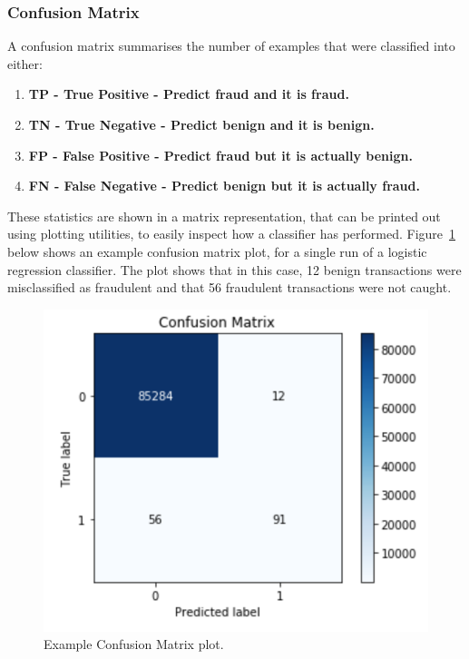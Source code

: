 \documentclass[12pt,a4paper,twoside]{report}
\begin{document}
\subsubsection{Confusion Matrix}

A confusion matrix\cite{stehman1997selecting} summarises the number of examples that were classified into either:\\
\begin{enumerate}
\item \textbf{TP - True Positive - Predict fraud and it is fraud.}
\item \textbf{TN - True Negative - Predict benign and it is benign.}
\item \textbf{FP - False Positive - Predict fraud but it is actually benign.}
\item \textbf{FN - False Negative - Predict benign but it is actually fraud.}

\end{enumerate}

These statistics are shown in a matrix representation, that can be printed out using plotting utilities, to easily inspect how a classifier has performed. Figure~\ref{fig:cm-example} below shows an example confusion matrix plot, for a single run of a logistic regression classifier. The plot shows that in this case, 12 benign transactions were misclassified as fraudulent and that 56 fraudulent transactions were not caught. 

\begin{figure}[H]
\centering
\includegraphics[scale=0.6]{cm-example}
\caption{Example Confusion Matrix plot.}
\label{fig:cm-example}
\end{figure}
\end{document}
